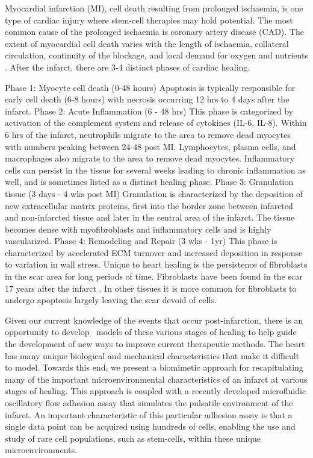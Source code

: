 Myocardial infarction (MI), cell death resulting from prolonged ischaemia, is one type of cardiac injury where stem-cell therapies may hold potential. The most common cause of the prolonged ischaemia is coronary artery disease (CAD). The extent of myocardial cell death varies with the length of ischaemia, collateral circulation, continuity of the blockage, and local demand for oxygen and nutrients \cite{Thygesen:2007ys,Alpert:2000ly}. After the infarct, there are 3-4 distinct phases of cardiac healing.

\begin{outline}
\1 Phase 1: Myocyte cell death (0-48 hours)
\2 Apoptosis is typically responsible for early cell death (6-8 hours) with necrosis occurring 12 hrs to 4 days after the infarct.
\1 Phase 2: Acute Inflammation (6 - 48 hrs)
\2 This phase is categorized by activation of the complement system and release of cytokines (IL-6, IL-8).  Within 6 hrs of the infarct, neutrophils migrate to the area to remove dead myocytes with numbers peaking between 24-48 post MI.  Lymphocytes, plasma cells, and macrophages also migrate to the area to remove dead myocytes. Inflammatory cells can persist in the tissue for several weeks leading to chronic inflammation as well, and is sometimes listed as a distinct healing phase.
\1 Phase 3: Granulation tissue (3 days - 4 wks post MI)
\2 Granulation is characterized by the deposition of new extracellular matrix proteins, first into the border zone between infarcted and non-infarcted tissue and later in the central area of the infarct.  The tissue becomes dense with myofibroblasts and inflammatory cells and is highly vascularized.
\1 Phase 4: Remodeling and Repair (3 wks - 1yr)
\2 This phase is characterized by accelerated ECM turnover and increased deposition in response to variation in wall stress.  Unique to heart healing is the persistence of fibroblasts in the scar area for long periods of time.  Fibroblasts have been found in the scar 17 years after the infarct \cite{Willems:1994fk}. In other tissues it is more common for fibroblasts to undergo apoptosis largely leaving the scar devoid of cells.
\end{outline}

Given our current knowledge of the events that occur post-infarction, there is an opportunity to develop \invitro\ models of these various stages of healing to help guide the development of new ways to improve current therapeutic methods. The heart has many unique biological and mechanical characteristics that make it difficult to model. Towards this end, we present a biomimetic approach for recapitulating many of the important microenvironmental characteristics of an infarct at various stages of healing. This approach is coupled with a recently developed microfluidic oscillatory flow adhesion assay that simulates the pulsatile environment of the infarct. An important characteristic of this particular adhesion assay is that a single data point can be acquired using hundreds of cells, enabling the use and study of rare cell populations, such as stem-cells, within these unique microenvironments. 

